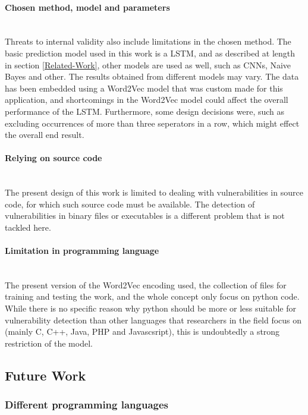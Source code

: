 \documentclass[
	a4paper,
	pagesize,
	pdftex,
	12pt,
	twoside, %
	BCOR=5mm, %
	ngerman,
	fleqn,
	final,
	]{scrartcl}
\begin{document}
\paragraph{Chosen method, model and parameters}\mbox{}\\
Threats to internal validity also include limitations in the chosen method. The basic prediction model used in this work is a LSTM, and as described at length in section \ref{Related-Work}, other models are used as well, such as CNNs, Naive Bayes and other. The results obtained from different models may vary. The data has been embedded using a Word2Vec model that was custom made for this application, and shortcomings in the Word2Vec model could affect the overall performance of the LSTM. Furthermore, some design decisions were, such as excluding occurrences of more than three seperators in a row, which might effect the overall end result.  
\paragraph{Relying on source code}\mbox{}\\
The present design of this work is limited to dealing with vulnerabilities in source code, for which such source code must be available. The detection of vulnerabilities in binary files or executables is a different problem that is not tackled here. 
\paragraph{Limitation in programming language}\mbox{}\\
The present version of the Word2Vec encoding used, the collection of files for training and testing the work, and the whole concept only focus on python code. While there is no specific reason why python should be more or less suitable for vulnerability detection than other languages that researchers in the field focus on (mainly C, C++, Java, PHP and Javascsript), this is undoubtedly a strong restriction of the model.


\subsection{Future Work}

\subsubsection{Different programming languages}

\subsubsection{}
\end{document}

